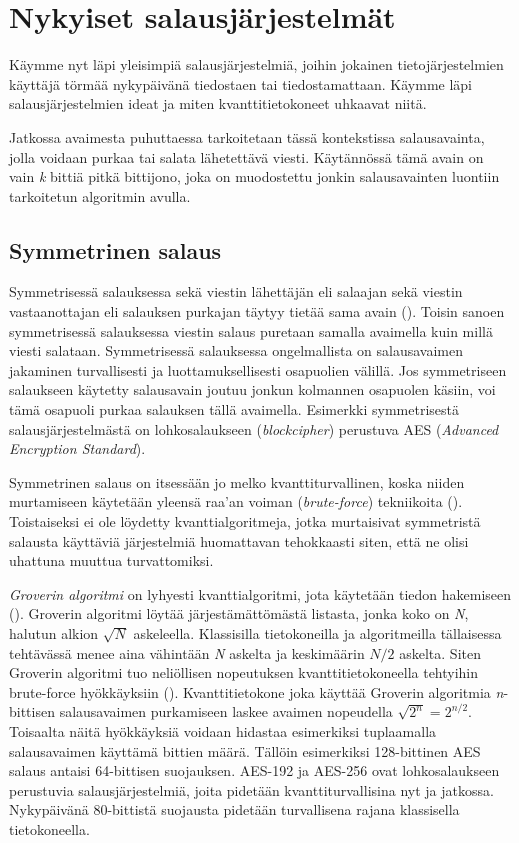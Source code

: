 \chapter{Nykyiset salausjärjestelmät\label{methods}}

Käymme nyt läpi yleisimpiä salausjärjestelmiä, joihin jokainen tietojärjestelmien käyttäjä törmää nykypäivänä tiedostaen tai tiedostamattaan. Käymme läpi salausjärjestelmien ideat ja miten kvanttitietokoneet uhkaavat niitä.

Jatkossa avaimesta puhuttaessa tarkoitetaan tässä kontekstissa salausavainta, jolla voidaan purkaa tai salata lähetettävä viesti. Käytännössä tämä avain on vain \emph{k} bittiä pitkä bittijono, joka on muodostettu jonkin salausavainten luontiin tarkoitetun algoritmin avulla.

\section{Symmetrinen salaus}
 Symmetrisessä salauksessa sekä viestin lähettäjän eli salaajan sekä viestin vastaanottajan eli salauksen purkajan täytyy tietää sama avain (\cite{bellare2005introduction}). Toisin sanoen symmetrisessä salauksessa viestin salaus puretaan samalla avaimella kuin millä viesti salataan.  Symmetrisessä salauksessa ongelmallista on salausavaimen jakaminen turvallisesti ja luottamuksellisesti osapuolien välillä. Jos symmetriseen salaukseen käytetty salausavain joutuu jonkun kolmannen osapuolen käsiin, voi tämä osapuoli purkaa salauksen tällä avaimella. Esimerkki symmetrisestä salausjärjestelmästä on lohkosalaukseen (\emph{blockcipher}) perustuva AES (\emph{Advanced Encryption Standard}).
 
 Symmetrinen salaus on itsessään jo melko kvanttiturvallinen, koska niiden murtamiseen käytetään yleensä raa'an voiman (\emph{brute-force}) tekniikoita (\cite{mavroeidis2018impact}). Toistaiseksi ei ole löydetty kvanttialgoritmeja, jotka murtaisivat symmetristä salausta käyttäviä järjestelmiä huomattavan tehokkaasti siten, että ne olisi uhattuna muuttua turvattomiksi. 
 
 \emph{Groverin algoritmi} on lyhyesti kvanttialgoritmi, jota käytetään tiedon hakemiseen (\cite{hayward2008quantum}). Groverin algoritmi löytää järjestämättömästä listasta, jonka koko on \emph{N}, halutun alkion $\sqrt{N}$ askeleella. Klassisilla tietokoneilla ja algoritmeilla tällaisessa tehtävässä menee aina vähintään \emph{N} askelta ja keskimäärin $N/2$ askelta. Siten Groverin algoritmi tuo neliöllisen nopeutuksen kvanttitietokoneella tehtyihin brute-force hyökkäyksiin (\cite{mavroeidis2018impact}). Kvanttitietokone joka käyttää Groverin algoritmia \emph{n}-bittisen salausavaimen purkamiseen laskee avaimen nopeudella $\sqrt{2^{n}} = 2^{n/2}$. Toisaalta näitä hyökkäyksiä voidaan hidastaa esimerkiksi tuplaamalla salausavaimen käyttämä bittien määrä. Tällöin esimerkiksi 128-bittinen AES salaus antaisi 64-bittisen suojauksen. AES-192 ja AES-256 ovat lohkosalaukseen perustuvia salausjärjestelmiä, joita pidetään kvanttiturvallisina nyt ja jatkossa. Nykypäivänä 80-bittistä suojausta pidetään turvallisena rajana klassisella tietokoneella.
 

